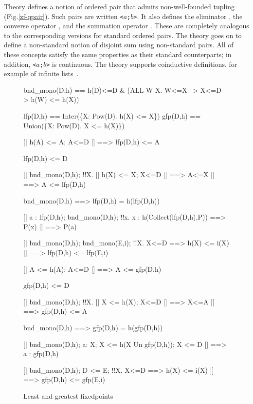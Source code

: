 Theory  defines a notion of ordered pair that admits
non-well-founded tupling (Fig.\ts\ref{zf-qpair}).  Such pairs are written
{\tt<$a$;$b$>}.  It also defines the eliminator , the
converse operator , and the summation operator
.  These are completely analogous to the corresponding
versions for standard ordered pairs.  The theory goes on to define a
non-standard notion of disjoint sum using non-standard pairs.  All of these
concepts satisfy the same properties as their standard counterparts; in
addition, {\tt<$a$;$b$>} is continuous.  The theory supports coinductive
definitions, for example of infinite lists~\cite{paulson-final}.

\begin{figure}
\begin{ttbox}
   bnd_mono(D,h) == 
                 h(D)<=D & (ALL W X. W<=X --> X<=D --> h(W) <= h(X))

        lfp(D,h) == Inter(\{X: Pow(D). h(X) <= X\})
        gfp(D,h) == Union(\{X: Pow(D). X <= h(X)\})


 [| h(A) <= A;  A<=D |] ==> lfp(D,h) <= A

     lfp(D,h) <= D

   [| bnd_mono(D,h);  
                  !!X. [| h(X) <= X;  X<=D |] ==> A<=X 
               |] ==> A <= lfp(D,h)

     bnd_mono(D,h) ==> lfp(D,h) = h(lfp(D,h))

         [| a : lfp(D,h);  bnd_mono(D,h);
                  !!x. x : h(Collect(lfp(D,h),P)) ==> P(x)
               |] ==> P(a)

       [| bnd_mono(D,h);  bnd_mono(E,i);
                  !!X. X<=D ==> h(X) <= i(X)  
               |] ==> lfp(D,h) <= lfp(E,i)

 [| A <= h(A);  A<=D |] ==> A <= gfp(D,h)

     gfp(D,h) <= D

      [| bnd_mono(D,h);  
                  !!X. [| X <= h(X);  X<=D |] ==> X<=A
               |] ==> gfp(D,h) <= A

     bnd_mono(D,h) ==> gfp(D,h) = h(gfp(D,h))

       [| bnd_mono(D,h); a: X; X <= h(X Un gfp(D,h)); X <= D 
               |] ==> a : gfp(D,h)

       [| bnd_mono(D,h);  D <= E;
                  !!X. X<=D ==> h(X) <= i(X)  
               |] ==> gfp(D,h) <= gfp(E,i)
\end{ttbox}
\caption{Least and greatest fixedpoints} \label{zf-fixedpt}
\end{figure}

